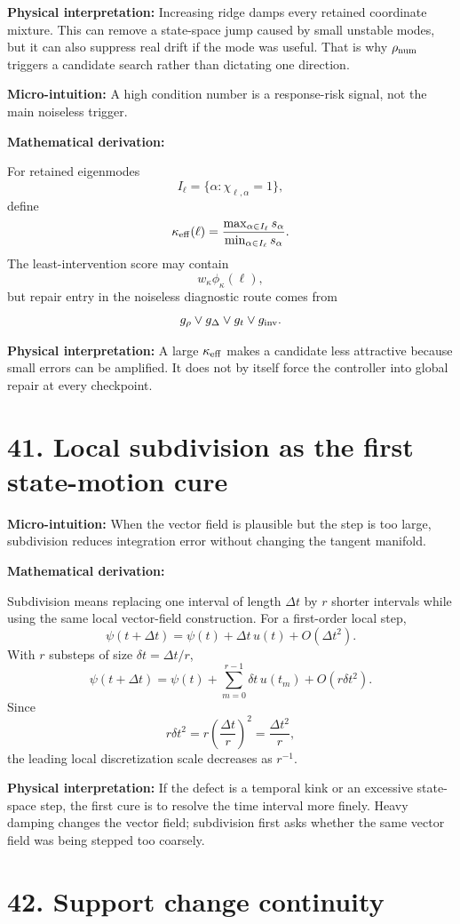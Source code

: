 \documentclass[10pt,twocolumn]{article}
\newcommand{\micro}[1]{%
  \par\smallskip
  \noindent\textcolor{deepblue}{\textbf{Micro-intuition:}} #1
  \par\smallskip}
\newcommand{\deriv}{%
  \par\noindent\textcolor{deepviolet}{\textbf{Mathematical derivation:}}\par\vspace{-1mm}}
\newcommand{\phys}[1]{%
  \par\smallskip
  \noindent\textcolor{deepgreen}{\textbf{Physical interpretation:}} #1
  \par\smallskip}
\begin{document}
\phys{Increasing ridge damps every retained coordinate mixture. This can remove
a state-space jump caused by small unstable modes, but it can also suppress
real drift if the mode was useful. That is why \(\rho_{\rm num}\) triggers a
candidate search rather than dictating one direction.}

\micro{A high condition number is a response-risk signal, not the main
noiseless trigger.}

\deriv
For retained eigenmodes
\[
I_\ell=\{\alpha:\chi_{\ell,\alpha}=1\},
\]
define
\[
\kappa_{\rm eff}(\ell)
=
\frac{\max_{\alpha\in I_\ell}s_\alpha}
{\min_{\alpha\in I_\ell}s_\alpha}.
\]
The least-intervention score may contain
\[
w_\kappa\phi_\kappa(\ell),
\]
but repair entry in the noiseless diagnostic route comes from
\[
g_\rho\vee g_\Delta\vee g_t\vee g_{\rm inv}.
\]

\phys{A large \(\kappa_{\rm eff}\) makes a candidate less attractive because
small errors can be amplified. It does not by itself force the controller into
global repair at every checkpoint.}

\section*{41. Local subdivision as the first state-motion cure}

\micro{When the vector field is plausible but the step is too large,
subdivision reduces integration error without changing the tangent manifold.}

\deriv
Subdivision means replacing one interval of length \(\Delta t\) by \(r\)
shorter intervals while using the same local vector-field construction.
For a first-order local step,
\[
\psi(t+\Delta t)
=
\psi(t)+\Delta t\,u(t)+O(\Delta t^2).
\]
With \(r\) substeps of size \(\delta t=\Delta t/r\),
\[
\psi(t+\Delta t)
=
\psi(t)
+
\sum_{m=0}^{r-1}\delta t\,u(t_m)
+
O(r\delta t^2).
\]
Since
\[
r\delta t^2
=
r\left(\frac{\Delta t}{r}\right)^2
=
\frac{\Delta t^2}{r},
\]
the leading local discretization scale decreases as \(r^{-1}\).

\phys{If the defect is a temporal kink or an excessive state-space step, the
first cure is to resolve the time interval more finely. Heavy damping changes
the vector field; subdivision first asks whether the same vector field was
being stepped too coarsely.}

\section*{42. Support change continuity}
\end{document}
